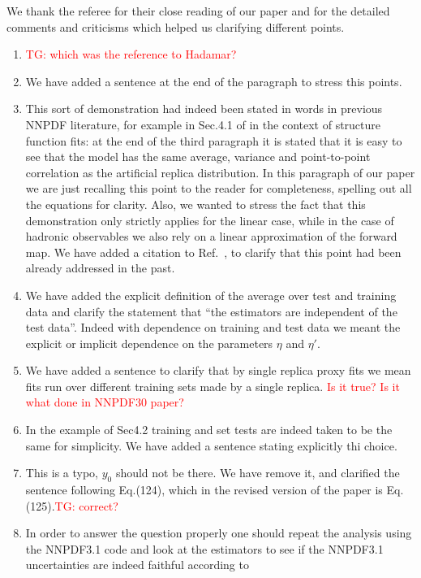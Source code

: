 \documentclass[11pt,a4paper]{article}
\numberwithin{equation}{section}
\numberwithin{figure}{section}
\numberwithin{table}{section}
\begin{document}
We thank the referee for their close reading of our paper and for the detailed comments and criticisms 
which helped us clarifying different points.
\begin{enumerate}
    \item \textcolor{red}{TG: which was the reference to Hadamar?}
    \item We have added a sentence at the end of the paragraph to stress this points.
    \item This sort of demonstration had indeed been stated in words in previous NNPDF literature,
    for example in Sec.4.1 of \cite{Forte:2002fg} in the context of structure function fits:
    at the end of the third paragraph it is stated that it is easy to see that
    the model has the same average, variance and point-to-point correlation
    as the artificial replica distribution. In this paragraph of our paper
    we are just recalling this point to the reader for completeness, spelling out all the equations for clarity.
    Also, we wanted to stress the fact that this demonstration only strictly applies for the linear case,
    while in the case of hadronic observables we also rely on a linear approximation of the 
    forward map. We have added a citation to Ref.~\cite{Forte:2002fg}, to clarify that this point
    had been already addressed in the past.
    \item We have added the explicit definition of the average over test and training data and 
    clarify the statement that ``the estimators are independent of the test data''. Indeed with dependence
    on training and test data we meant the explicit or implicit dependence on the parameters $\eta$ and $\eta'$.
    \item We have added a sentence to clarify that by single replica proxy fits we mean fits
    run over different training sets made by a single replica. \textcolor{red}{Is it true? Is it what done in NNPDF30
    paper?}
    \item In the example of Sec4.2 training and set tests are indeed taken to be the same for simplicity.
    We have added a sentence stating explicitly thi choice.
    \item This is a typo, $y_0$ should not be there. We have remove it, and clarified the sentence following Eq.(124),
    which in the revised version of the paper is Eq.(125).\textcolor{red}{TG: correct?}
    \item In order to answer the question properly one should repeat the analysis using the 
    NNPDF3.1 code and look at the estimators to see if the NNPDF3.1 uncertainties are indeed faithful according to 

\end{enumerate}
\end{document}
